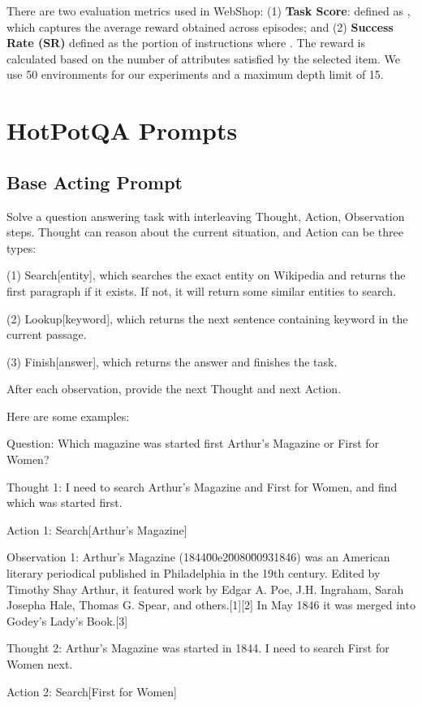 \documentclass{article} \usepackage{iclr2024_conference,times}
\begin{document}
There are two evaluation metrics used in WebShop: (1) \textbf{Task Score}: defined as , which captures the average reward obtained across episodes; and (2) \textbf{Success Rate (SR)} defined as the portion of instructions where . The reward is calculated based on the number of attributes satisfied by the selected item. We use 50 environments for our experiments and a maximum depth limit of 15.

\section{HotPotQA Prompts}
\label{sec:hotpotqa_prompt}
\subsection{Base Acting Prompt}

Solve a question answering task with interleaving Thought, Action, Observation steps. Thought can reason about the current situation, and Action can be three types: 

(1) Search[entity], which searches the exact entity on Wikipedia and returns the first paragraph if it exists. If not, it will return some similar entities to search.

(2) Lookup[keyword], which returns the next sentence containing keyword in the current passage.

(3) Finish[answer], which returns the answer and finishes the task.

After each observation, provide the next Thought and next Action. 

Here are some examples:

Question: Which magazine was started first Arthur's Magazine or First for Women?

Thought 1: I need to search Arthur's Magazine and First for Women, and find which was started first.

Action 1: Search[Arthur's Magazine]

Observation 1: Arthur's Magazine (1844\u00e2\u0080\u00931846) was an American literary periodical published in Philadelphia in the 19th century. Edited by Timothy Shay Arthur, it featured work by Edgar A. Poe, J.H. Ingraham, Sarah Josepha Hale, Thomas G. Spear, and others.[1][2] In May 1846 it was merged into Godey's Lady's Book.[3]

Thought 2: Arthur's Magazine was started in 1844. I need to search First for Women next.

Action 2: Search[First for Women]
\end{document}

